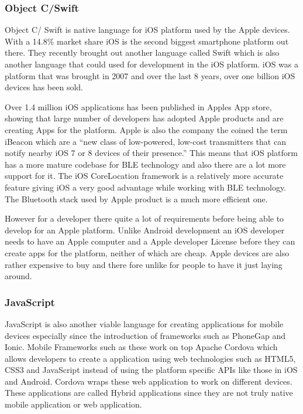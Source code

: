 \subsubsection{Object C/Swift}

Object C/ Swift is native language for iOS platform used by the Apple
devices. With a 14.8\% market share iOS is the second biggest smartphone
platform out there\cite{market-share}. They recently brought out
another language called Swift which is also another language that
could used for development in the iOS platform. iOS was a platform
that was brought in 2007 and over the last 8 years, over one billion
iOS devices has been sold\cite{oneBios}.

Over 1.4 million iOS applications has been published in Apples App
store, showing that large number of developers has adopted Apple products
and are creating Apps for the platform. Apple is also the company
the coined the term iBeacon which are a ``new class of low-powered,
low-cost transmitters that can notify nearby iOS 7 or 8 devices of
their presence.'' This means that iOS platform has a more mature
codebase for BLE technology and also there are a lot more support
for it. The iOS CoreLocation\cite{corelocation} framework is a relatively
more accurate feature giving iOS a very good advantage while working
with BLE technology. The Bluetooth stack used by Apple product is
a much more efficient one.

However for a developer there quite a lot of requirements before being
able to develop for an Apple platform. Unlike Android development
an iOS developer needs to have an Apple computer and a Apple developer
License before they can create apps for the platform, neither of which
are cheap. Apple devices are also rather expensive to buy and there
fore unlike for people to have it just laying around.


\subsubsection{JavaScript}

JavaScript is also another viable language for creating applications
for mobile devices especially since the introduction of frameworks
such as PhoneGap\cite{phonegap} and Ionic\cite{ionic}. Mobile Frameworks
such as these work on top Apache Cordova which allows developers to
create a application using web technologies such as HTML5, CSS3 and
JavaScript instead of using the platform specific APIs like those
in iOS and Android. Cordova wraps these web application to work on
different devices. These applications are called Hybrid applications
since they are not truly native mobile application or web application.

